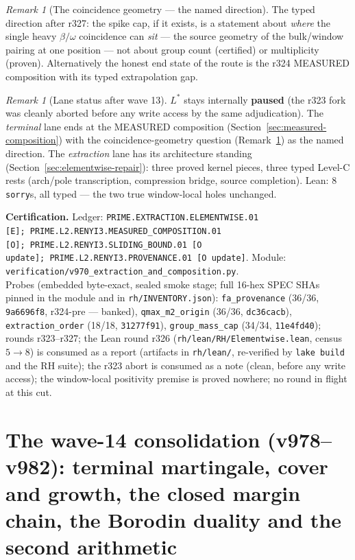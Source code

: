 \documentclass[11pt]{article}
\newcommand{\certbox}[3]{%
  \par\medskip\noindent\colorbox{certgray}{\parbox{\dimexpr\linewidth-2\fboxsep}{%
    \footnotesize\raggedright\textbf{Certification.} Ledger: \texttt{#1}.\quad
    Module: \texttt{#2}.\\ #3}}\par\medskip}
\theoremstyle{definition}
\theoremstyle{remark}
\newtheorem{remark}[theorem]{Remark}
\begin{document}
\begin{remark}[The coincidence geometry --- the named
direction]\label{rem:coincidence}
The typed direction after r327: the spike cap, if it exists, is a
statement about \emph{where} the single heavy $\beta/\omega$
coincidence can \emph{sit} --- the source geometry of the
bulk/window pairing at one position --- not about group count
(certified) or multiplicity (proven).  Alternatively the honest end
state of the route is the r324 MEASURED composition with its typed
extrapolation gap.
\end{remark}

\begin{remark}[Lane status after wave 13]\label{rem:lanestatus-v970}
$L^*$ stays internally \textbf{paused} (the r323 fork was cleanly
aborted before any write access by the same adjudication).  The
\emph{terminal} lane ends at the MEASURED composition
(Section~\ref{sec:measured-composition}) with the
coincidence-geometry question (Remark~\ref{rem:coincidence}) as the
named direction.  The \emph{extraction} lane has its architecture
standing (Section~\ref{sec:elementwise-repair}): three proved kernel
pieces, three typed Level-C rests (arch/pole transcription,
compression bridge, source completion).  Lean: 8 \texttt{sorry}s,
all typed --- the two true window-local holes unchanged.
\end{remark}

\certbox{PRIME.EXTRACTION.ELEMENTWISE.01 [E];\
PRIME.L2.RENYI3.MEASURED\_COMPOSITION.01 [O];\
PRIME.L2.RENYI3.SLIDING\_BOUND.01 [O update];\
PRIME.L2.RENYI3.PROVENANCE.01 [O update]}%
{verification/v970\_extraction\_and\_composition.py}%
{Probes (embedded byte-exact, sealed smoke stage; full 16-hex SPEC
SHAs pinned in the module and in \texttt{rh/INVENTORY.json}):
\texttt{fa\_provenance} (36/36, \texttt{9a6696f8}, r324-pre ---
banked), \texttt{qmax\_m2\_origin} (36/36, \texttt{dc36cacb}),
\texttt{extraction\_order} (18/18, \texttt{31277f91}),
\texttt{group\_mass\_cap} (34/34, \texttt{11e4fd40});
rounds r323--r327; the Lean round r326
(\texttt{rh/lean/RH/Elementwise.lean}, census $5 \to 8$) is
consumed as a report (artifacts in \texttt{rh/lean/}, re-verified
by \texttt{lake build} and the RH suite); the r323 abort is
consumed as a note (clean, before any write access); the
window-local positivity premise is proved nowhere; no round in
flight at this cut.}

\section{The wave-14 consolidation (v978--v982): terminal martingale,
cover and growth, the closed margin chain, the Borodin duality and the
second arithmetic}\label{sec:wave14}
\end{document}
